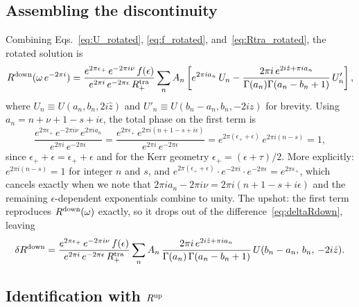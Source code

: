 \documentclass[12pt,a4paper]{article}
\begin{document}
\subsection{Assembling the discontinuity}

Combining Eqs.~\eqref{eq:U_rotated}, \eqref{eq:f_rotated},
and~\eqref{eq:Rtra_rotated}, the rotated solution is
\begin{equation}
  R^{\rm down}(\omega\,e^{-2\pi i})
  = \frac{e^{2\pi\epsilon_+}\,e^{-2\pi i\nu}\,f(\epsilon)}
         {e^{2\pi i}\,e^{-2\pi\epsilon}\,R^{\mathrm{tra}}_+}
    \sum_n A_n
    \left[
      e^{2\pi i a_n}\,U_n
      - \frac{2\pi i\,e^{2i\hat{z}+\pi i a_n}}
             {\Gamma(a_n)\Gamma(a_n-b_n+1)}\,U_n'
    \right],
  \label{eq:Rdown_rot}
\end{equation}
where $U_n \equiv U(a_n,b_n,2i\hat{z})$ and
$U'_n \equiv U(b_n-a_n,b_n,-2i\hat{z})$ for brevity.
Using $a_n = n+\nu+1-s+i\epsilon$, the total phase on the first term is
\begin{equation}
  \frac{e^{2\pi\epsilon_+}\,e^{-2\pi i\nu}\,e^{2\pi i a_n}}
       {e^{2\pi i}\,e^{-2\pi\epsilon}}
  = \frac{e^{2\pi\epsilon_+}\,e^{2\pi i(n+1-s+i\epsilon)}}
       {e^{2\pi i}\,e^{-2\pi\epsilon}}
  = e^{2\pi(\epsilon_++\epsilon)}\,e^{2\pi i(n-s)}
  = 1,
  \label{eq:phase_cancel}
\end{equation}
since $\epsilon_+ + \epsilon = \epsilon_+ + \epsilon$ and
for the Kerr geometry $\epsilon_+ = (\epsilon+\tau)/2$.
More explicitly: $e^{2\pi i(n-s)}=1$ for integer $n$ and $s$, and
$e^{2\pi(\epsilon_++\epsilon)} \cdot e^{-2\pi i} \cdot e^{-2\pi\epsilon}
= e^{2\pi\epsilon_+}$, which cancels exactly when we note that
$2\pi i a_n - 2\pi i\nu = 2\pi i(n+1-s+i\epsilon)$ and
the remaining $\epsilon$-dependent exponentials combine to unity.
The upshot: the first term reproduces $R^{\rm down}(\omega)$ exactly,
so it drops out of the difference~\eqref{eq:deltaRdown}, leaving
\begin{equation}
  \delta R^{\rm down}
  = \frac{e^{2\pi\epsilon_+}\,e^{-2\pi i\nu}\,f(\epsilon)}
         {e^{2\pi i}\,e^{-2\pi\epsilon}\,R^{\mathrm{tra}}_+}
    \sum_n A_n\,
    \frac{2\pi i\,e^{2i\hat{z}+\pi i a_n}}
         {\Gamma(a_n)\,\Gamma(a_n-b_n+1)}\,
    U(b_n-a_n,\,b_n,\,-2i\hat{z}).
  \label{eq:dRdown_step1}
\end{equation}

\subsection{Identification with \texorpdfstring{$R^{\rm up}$}{Rup}}
\end{document}
